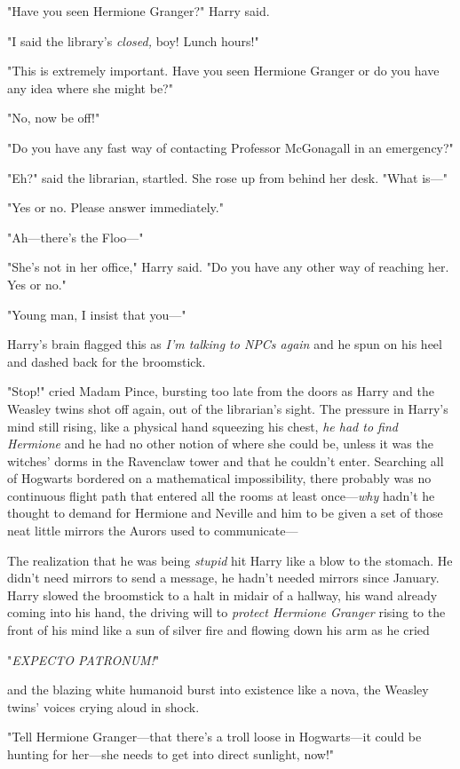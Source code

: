"Have you seen Hermione Granger?" Harry said.

"I said the library's \emph{closed,} boy! Lunch hours!"

"This is extremely important. Have you seen Hermione Granger or do you have any
idea where she might be?"

"No, now be off!"

"Do you have any fast way of contacting Professor McGonagall in an emergency?"

"Eh?" said the librarian, startled. She rose up from behind her desk. "What
is—"

"Yes or no. Please answer immediately."

"Ah—there's the Floo—"

"She's not in her office," Harry said. "Do you have any other way of reaching
her. Yes or no."

"Young man, I insist that you—"

Harry's brain flagged this as \emph{I'm talking to NPCs again} and he spun on
his heel and dashed back for the broomstick.

"Stop!" cried Madam Pince, bursting too late from the doors as Harry and the
Weasley twins shot off again, out of the librarian's sight. The pressure in
Harry's mind still rising, like a physical hand squeezing his chest, \emph{he
had to find Hermione} and he had no other notion of where she could be, unless
it was the witches' dorms in the Ravenclaw tower and that he couldn't enter.
Searching all of Hogwarts bordered on a mathematical impossibility, there
probably was no continuous flight path that entered all the rooms at least
once—\emph{why} hadn't he thought to demand for Hermione and Neville and him
to be given a set of those neat little mirrors the Aurors used to communicate—

The realization that he was being \emph{stupid} hit Harry like a blow to the
stomach. He didn't need mirrors to send a message, he hadn't needed mirrors
since January. Harry slowed the broomstick to a halt in midair of a hallway,
his wand already coming into his hand, the driving will to \emph{protect
Hermione Granger} rising to the front of his mind like a sun of silver fire and
flowing down his arm as he cried

"\emph{EXPECTO PATRONUM!}"

and the blazing white humanoid burst into existence like a nova, the Weasley
twins' voices crying aloud in shock.

"Tell Hermione Granger—that there's a troll loose in Hogwarts—it could be
hunting for her—she needs to get into direct sunlight, now!"

